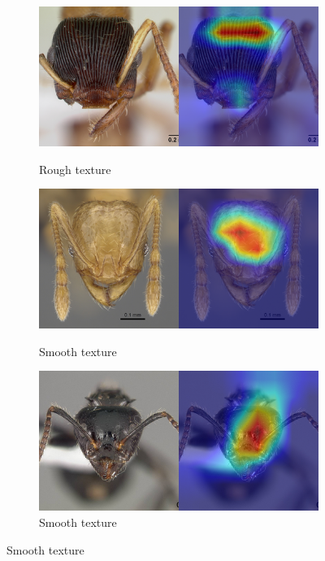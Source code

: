 \documentclass{aci}
\numberwithin{equation}{section}
\begin{document}
\begin{figure}
    \centering
    \begin{subfigure}{\subwidth}
        \caption*{Rough texture}
        \includegraphics[width=1\linewidth]{thesis_assets/gradcam/incorrect_ideal/84.png}
        \label{fig:incorrect_ideal_84}
    \end{subfigure}
    \begin{subfigure}{\subwidth}
        \caption*{Smooth texture}
        \includegraphics[width=1\linewidth]{thesis_assets/gradcam/incorrect_ideal/86.png}
        \label{fig:incorrect_ideal_86}
    \end{subfigure}
    \begin{subfigure}{\subwidth}
        \caption*{Smooth texture}
        \includegraphics[width=1\linewidth]{thesis_assets/gradcam/incorrect_ideal/177.png}

\end{subfigure}
\end{figure}
\end{document}
